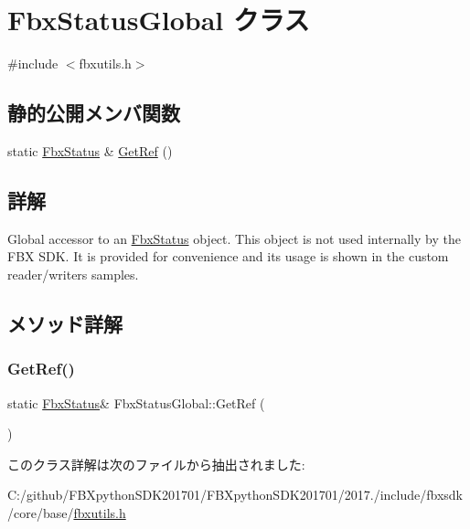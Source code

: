 \hypertarget{class_fbx_status_global}{}\section{Fbx\+Status\+Global クラス}
\label{class_fbx_status_global}


{\ttfamily \#include $<$fbxutils.\+h$>$}

\subsection*{静的公開メンバ関数}
\begin{DoxyCompactItemize}
\item 
static \hyperlink{class_fbx_status}{Fbx\+Status} \& \hyperlink{class_fbx_status_global_a1a20a57303f6db962a715d16d9c849d9}{Get\+Ref} ()
\end{DoxyCompactItemize}


\subsection{詳解}
Global accessor to an \hyperlink{class_fbx_status}{Fbx\+Status} object. This object is not used internally by the F\+BX S\+DK. It is provided for convenience and its usage is shown in the custom reader/writers samples. 

\subsection{メソッド詳解}
\mbox{\label{class_fbx_status_global_a1a20a57303f6db962a715d16d9c849d9}} 
\subsubsection{\texorpdfstring{Get\+Ref()}{GetRef()}}
{\footnotesize\ttfamily static \hyperlink{class_fbx_status}{Fbx\+Status}\& Fbx\+Status\+Global\+::\+Get\+Ref (\begin{DoxyParamCaption}{ }\end{DoxyParamCaption})\hspace{0.3cm}{\ttfamily [static]}}



このクラス詳解は次のファイルから抽出されました\+:\begin{DoxyCompactItemize}
\item 
C\+:/github/\+F\+B\+Xpython\+S\+D\+K201701/\+F\+B\+Xpython\+S\+D\+K201701/2017./include/fbxsdk/core/base/\hyperlink{fbxutils_8h}{fbxutils.\+h}\end{DoxyCompactItemize}
